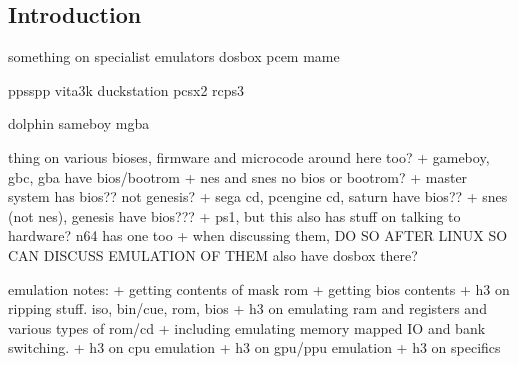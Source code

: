 
\subsection{Introduction}


something on specialist emulators
dosbox
pcem
mame

ppsspp
vita3k
duckstation
pcsx2
rcps3

dolphin
sameboy
mgba


thing on various bioses, firmware and microcode around here too?
+ gameboy, gbc, gba have bios/bootrom
+ nes and snes no bios or bootrom?
+ master system has bios?? not genesis?
+ sega cd, pcengine cd, saturn have bios??
+ snes (not nes), genesis have bios???
+ ps1, but this also has stuff on talking to hardware? n64 has one too
+ when discussing them, DO SO AFTER LINUX SO CAN DISCUSS EMULATION OF THEM also have dosbox there?

emulation notes:
+ getting contents of mask rom
+ getting bios contents
+ h3 on ripping stuff. iso, bin/cue, rom, bios
+ h3 on emulating ram and registers and various types of rom/cd
+ including emulating memory mapped IO and bank switching.
+ h3 on cpu emulation
+ h3 on gpu/ppu emulation
+ h3 on specifics


